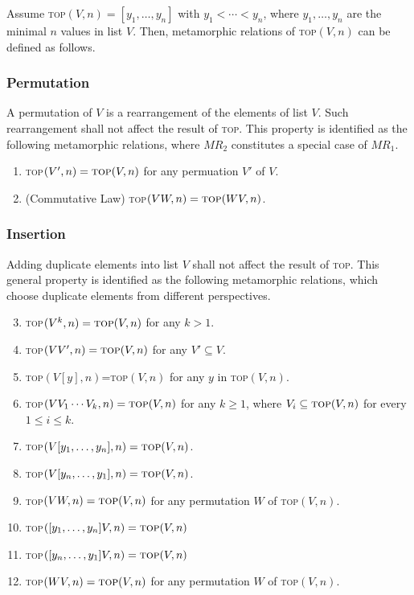 \documentclass[conference]{IEEEtran}
\theoremstyle{remark}
\newcommand{\Fn}{\textsc{top}}
\newcommand{\MR}{\textit{MR}}
\begin{document}
Assume \Fn$(V,n)=[y_1,\ldots,y_n]$ with $y_1<\cdots< y_n$, where $y_1,\ldots,y_n$ are the minimal $n$ values in list $V$. Then, metamorphic relations of \Fn$(V,n)$ can be defined as follows.

\subsubsection{Permutation}
A permutation of $V$ is a rearrangement of the elements of list $V$. Such rearrangement shall not affect the result of \Fn. This property is identified as the following metamorphic relations, where $\MR_2$ constitutes a special case of $\MR_1$.
\begin{enumerate}[\MR-1]
\item \Fn$(V',n)=\Fn(V,n)$ for any permuation $V'$ of $V$.
\item (Commutative Law) \Fn$(VW,n)=\Fn(WV,n)$.
\end{enumerate}

\subsubsection{Insertion}
Adding duplicate elements into list $V$ shall not affect the result of \Fn. This general property is  identified as the following metamorphic relations, which choose duplicate elements from different perspectives.
\begin{enumerate}[\MR-1]
\setcounter{enumi}{2}
\item \Fn$(V^k,n)=\Fn(V,n)$ for any $k>1$.
\item \Fn$(VV',n)=\Fn(V,n)$ for any $V'\subseteq V$.
\item \Fn$(V[y],n)$=\Fn$(V,n)$ for any $y$ in \Fn$(V,n)$.
\item \Fn$(VV_1\cdots V_k,n)=\Fn(V,n)$ for any $k\geq 1$, where $V_i\subseteq\Fn(V,n)$ for every $1\leq i\leq k$.
\item \Fn$(V[y_1,\ldots,y_n],n)=\Fn(V,n)$.
\item \Fn$(V[y_n,\ldots,y_1],n)=\Fn(V,n)$.
\item \Fn$(VW,n)=\Fn(V,n)$ for any permutation $W$ of \Fn$(V,n)$.
\item \Fn$([y_1,\ldots,y_n]V,n)=\Fn(V,n)$
\item \Fn$([y_n,\ldots,y_1]V,n)=\Fn(V,n)$
\item \Fn$(WV,n)=\Fn(V,n)$ for any permutation $W$ of \Fn$(V,n)$.
\end{enumerate}
\end{document}
